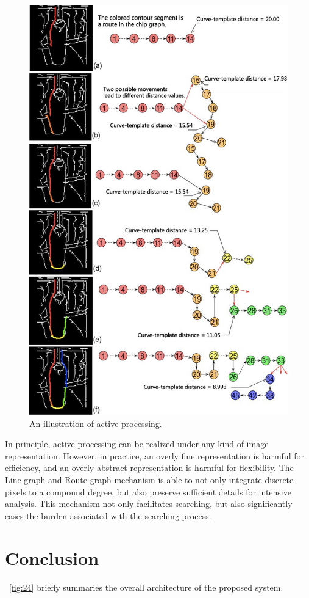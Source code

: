 \documentclass{article}
\begin{document}
\begin{figure}[!t]
\centering
\includegraphics[width=0.8\linewidth]{images/fig23.jpg}
\caption{An illustration of active-processing.}
\label{fig:23}
\end{figure}

In principle, active processing can be realized under any kind of image representation. 
However, in practice, an overly fine representation is harmful for efficiency, 
and an overly abstract representation is harmful for flexibility. 
The Line-graph and Route-graph mechanism is able to not only integrate discrete pixels to a compound degree, 
but also preserve sufficient details for intensive analysis. 
This mechanism not only facilitates searching, 
but also significantly eases the burden associated with the searching process.

\section{Conclusion}

\figurename~\ref{fig:24} briefly summaries the overall architecture of the proposed system.
\end{document}
